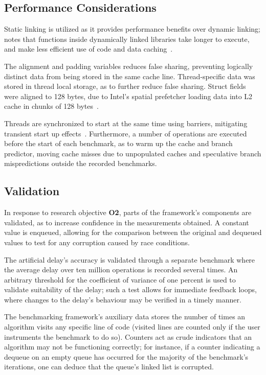 \subsection{Performance Considerations}
Static linking is utilized as it provides performance benefits over dynamic
linking; \citeauthor{fog2020optimizing} notes that functions inside dynamically
linked libraries take longer to execute, and make less efficient use of code
and data caching~\citep[Section~14.11]{fog2020optimizing}.

The alignment and padding variables reduces false sharing, preventing logically
distinct data from being stored in the same cache line.
Thread-specific data was stored in thread local storage, as to further reduce
false sharing. Struct fields were aligned to 128 bytes, due to
Intel's spatial prefetcher loading data into L2
cache in chunks of 128 bytes~\citep[Section~E.2.5.4]{intelmanualoptimization}.

Threads are synchronized to start at the same time using
barriers, mitigating transient start up effects~\citep{hoffman2007baskets}.
Furthermore, a number of operations are executed before the start of each
benchmark, as to warm up the cache and branch predictor, moving cache misses
due to unpopulated caches and speculative branch mispredictions outside the
recorded benchmarks.

\subsection{Validation\label{sec:design_and_implementation_validation}}
In response to research objective \textbf{O2}, parts of the framework's
components are validated, as to increase confidence in the measurements
obtained. A constant value is enqueued, allowing for the comparison
between the original and dequeued values to test for any corruption caused by race conditions. 

The artificial delay's accuracy is validated through a separate
benchmark where the average delay over ten million operations is recorded several times.
An arbitrary threshold for the coefficient of variance of one percent is used
to validate suitability of the delay; such a test allows for immediate feedback
loops, where changes to the delay's behaviour may be verified in a timely
manner.

The benchmarking framework's auxiliary data stores the number of times an
algorithm visits any specific line of code (visited lines are counted only if
the user instruments the benchmark to do so). Counters act as crude indicators that an
algorithm may not be functioning correctly; for instance, if a counter indicating a
dequeue on an empty queue has occurred for the majority of the benchmark's
iterations, one can deduce that the queue's linked list is corrupted. 


